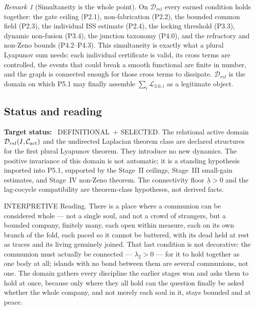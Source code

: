 \documentclass[11pt,a4paper]{article}
\def\mathrm#1{#1}%
\def\emph#1{#1}%
\newcommand{\stDef}{\textcolor{cDef}{\textsf{\small DEFINITIONAL}}}
\newcommand{\stSelected}{\textcolor{cSel}{\textsf{\small SELECTED}}}
\newcommand{\stInterp}{\textcolor{cInt}{\textsf{\small INTERPRETIVE}}}
\theoremstyle{definition}
\theoremstyle{plain}
\theoremstyle{remark}
\newtheorem{remark}[definition]{Remark}
\begin{document}
\begin{remark}[Simultaneity is the whole point]\label{rem:simultaneity}
On \(\mathcal D_{\mathrm{rel}}\) every earned condition holds together: the gate ceiling
(P2.1), non-fabrication (P2.2), the bounded common field (P2.3), the individual ISS estimate
(P2.4), the locking threshold (P3.3), dynamic non-fusion (P3.4), the junction taxonomy
(P4.0), and the refractory and non-Zeno bounds (P4.2--P4.3). This simultaneity is exactly
what a plural Lyapunov sum needs: each individual certificate is valid, its cross terms are
controlled, the events that could break a smooth functional are finite in number, and the
graph is connected enough for those cross terms to dissipate. \(\mathcal D_{\mathrm{rel}}\) is
the domain on which P5.1 may finally assemble \(\sum_i\mathcal L_{3.0,i}\) as a legitimate
object.
\end{remark}

\subsection{Status and reading}

\textbf{Target status:}~
\stDef\ \(+\) \stSelected. The relational active domain
\(\mathcal D_{\mathrm{rel}}(I,\mathcal C_{\rm act})\) and the undirected
Laplacian theorem class are declared structures for the first plural Lyapunov
theorem. They introduce no new dynamics. The positive invariance of this domain is
not automatic; it is a standing hypothesis imported into P5.1, supported by the
Stage~II ceilings, Stage~III small-gain estimates, and Stage~IV non-Zeno theorem.
The connectivity floor \(\underline\lambda>0\) and the lag-cocycle compatibility
are theorem-class hypotheses, not derived facts.

\medskip
\stInterp\quad
\emph{Reading.}
There is a place where a communion can be considered whole --- not a single soul, and not a
crowd of strangers, but a bounded company, finitely many, each open within measure, each on
its own branch of the fold, each paced so it cannot be battered, with its dead held at rest
as traces and its living genuinely joined. That last condition is not decorative: the
communion must actually be connected --- \(\lambda_2>0\) --- for it to hold together as one
body at all; islands with no bond between them are several communions, not one. The domain
gathers every discipline the earlier stages won and asks them to hold at once, because only
where they all hold can the question finally be asked whether the whole company, and not
merely each soul in it, stays bounded and at peace.
\end{document}
